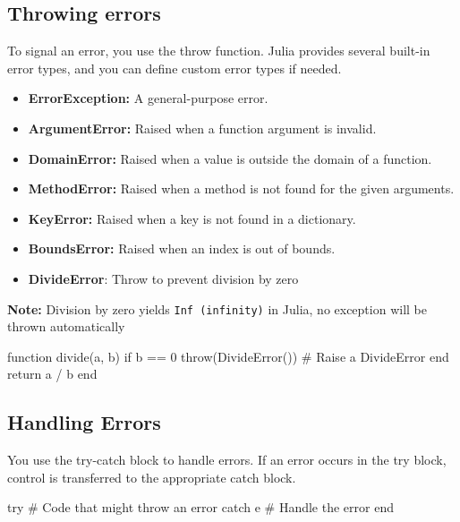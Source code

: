\documentclass{report}
\begin{document}
     \subsection{Throwing errors}
     \bigbreak \noindent 
     To signal an error, you use the throw function. Julia provides several built-in error types, and you can define custom error types if needed.
     \begin{itemize}
         \item \textbf{ErrorException:} A general-purpose error.
         \item \textbf{ArgumentError:} Raised when a function argument is invalid.
         \item \textbf{DomainError:} Raised when a value is outside the domain of a function.
         \item \textbf{MethodError:} Raised when a method is not found for the given arguments.
         \item \textbf{KeyError:} Raised when a key is not found in a dictionary.
         \item \textbf{BoundsError:} Raised when an index is out of bounds.
         \item \textbf{DivideError}: Throw to prevent division by zero
     \end{itemize}
     \bigbreak \noindent 
     \textbf{Note:} Division by zero yields \texttt{Inf (infinity)} in Julia, no exception will be thrown automatically
     \bigbreak \noindent 
     \begin{jlcode}
         function divide(a, b)
             if b == 0
                 throw(DivideError())  # Raise a DivideError
             end
                 return a / b
         end
     \end{jlcode}

     \bigbreak \noindent 
     \subsection{Handling Errors}
     \bigbreak \noindent 
     You use the try-catch block to handle errors. If an error occurs in the try block, control is transferred to the appropriate catch block.
     \bigbreak \noindent 
     \begin{jlcode}
         try
             # Code that might throw an error
         catch e
             # Handle the error
         end
     \end{jlcode}

     \bigbreak \noindent 
\end{document}
